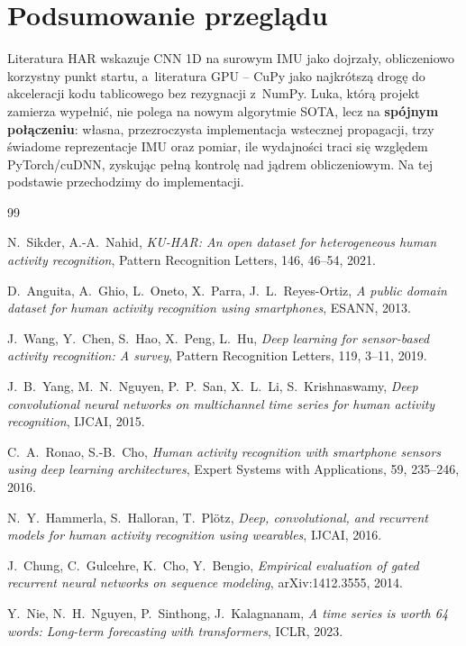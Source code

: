 \documentclass[12pt,a4paper]{article}
\begin{document}
\section{Podsumowanie przeglądu}

Literatura HAR wskazuje CNN 1D na surowym IMU jako dojrzały, obliczeniowo korzystny punkt startu, a~literatura GPU -- CuPy jako najkrótszą drogę do akceleracji kodu tablicowego bez rezygnacji z~NumPy. Luka, którą projekt zamierza wypełnić, nie polega na nowym algorytmie SOTA, lecz na \textbf{spójnym połączeniu}: własna, przezroczysta implementacja wstecznej propagacji, trzy świadome reprezentacje IMU oraz pomiar, ile wydajności traci się względem PyTorch/cuDNN, zyskując pełną kontrolę nad jądrem obliczeniowym. Na tej podstawie przechodzimy do implementacji.

\begin{thebibliography}{99}

N.~Sikder, A.-A.~Nahid,
\textit{KU-HAR: An open dataset for heterogeneous human activity recognition},
Pattern Recognition Letters, 146, 46--54, 2021.

D.~Anguita, A.~Ghio, L.~Oneto, X.~Parra, J.~L.~Reyes-Ortiz,
\textit{A public domain dataset for human activity recognition using smartphones},
ESANN, 2013.

J.~Wang, Y.~Chen, S.~Hao, X.~Peng, L.~Hu,
\textit{Deep learning for sensor-based activity recognition: A survey},
Pattern Recognition Letters, 119, 3--11, 2019.

J.~B.~Yang, M.~N.~Nguyen, P.~P.~San, X.~L.~Li, S.~Krishnaswamy,
\textit{Deep convolutional neural networks on multichannel time series for human activity recognition},
IJCAI, 2015.

C.~A.~Ronao, S.-B.~Cho,
\textit{Human activity recognition with smartphone sensors using deep learning architectures},
Expert Systems with Applications, 59, 235--246, 2016.

N.~Y.~Hammerla, S.~Halloran, T.~Plötz,
\textit{Deep, convolutional, and recurrent models for human activity recognition using wearables},
IJCAI, 2016.

J.~Chung, C.~Gulcehre, K.~Cho, Y.~Bengio,
\textit{Empirical evaluation of gated recurrent neural networks on sequence modeling},
arXiv:1412.3555, 2014.

Y.~Nie, N.~H.~Nguyen, P.~Sinthong, J.~Kalagnanam,
\textit{A time series is worth 64 words: Long-term forecasting with transformers},
ICLR, 2023.


\end{thebibliography}
\end{document}
